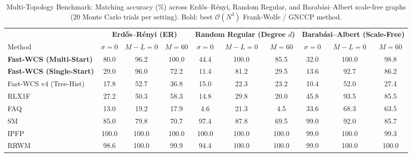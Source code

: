 \begin{table}[!t]
\centering
\caption{Multi-Topology Benchmark: Matching accuracy (\%) across Erdős–Rényi, Random Regular, and Barabási–Albert scale-free graphs (20 Monte Carlo trials per setting). Bold: best $\mathcal{O}(N^3)$ Frank-Wolfe / GNCCP method.}
\label{tab:topologies}
\fontsize{6.8}{8.2}\selectfont
\setlength{\tabcolsep}{2.8pt}
\begin{tabular*}{\textwidth}{@{\extracolsep{\fill}}lccccccccc@{}}
\toprule
 & \multicolumn{3}{c}{\textbf{Erdős–Rényi (ER)}} & \multicolumn{3}{c}{\textbf{Random Regular (Degree $d$)}} & \multicolumn{3}{c}{\textbf{Barabási–Albert (Scale-Free)}} \\
\cmidrule(lr){2-4}\cmidrule(lr){5-7}\cmidrule(l){8-10}
Method & $\sigma{=}0$ & $M{-}L{=}0$ & $M{=}60$ & $\sigma{=}0$ & $M{-}L{=}0$ & $M{=}60$ & $\sigma{=}0$ & $M{-}L{=}0$ & $M{=}60$ \\
\midrule
\textbf{Fast-WCS (Multi-Start)} & 80.0 & 96.2 & 100.0 & 44.4 & 100.0 & 85.5 & 32.0 & 100.0 & 98.8 \\
\textbf{Fast-WCS (Single-Start)} & 29.0 & 96.0 & 72.2 & 11.4 & 81.2 & 29.5 & 13.6 & 92.7 & 86.2 \\
Fast-WCS v4 (Tree-Hist) & 17.8 & 52.7 & 36.8 & 15.0 & 22.3 & 23.2 & 10.4 & 52.0 & 27.4 \\
\midrule
RLX1F~\cite{yang2018algorithm} & 27.2 & 50.3 & 58.3 & 14.8 & 29.8 & 20.0 & 45.8 & 93.5 & 85.5 \\
\midrule
FAQ~\cite{vogelstein2015fast} & 13.0 & 19.2 & 17.9 & 4.6 & 21.3 & 4.5 & 33.6 & 68.3 & 63.5 \\
SM~\cite{leordeanu2005} & 85.0 & 79.8 & 70.7 & 97.4 & 87.8 & 69.5 & 99.0 & 92.0 & 85.7 \\
IPFP~\cite{leordeanu2009ipfp} & 100.0 & 100.0 & 100.0 & 100.0 & 100.0 & 100.0 & 99.0 & 100.0 & 99.3 \\
RRWM~\cite{cho2010rrwm} & 98.6 & 100.0 & 99.9 & 94.4 & 100.0 & 100.0 & 99.0 & 100.0 & 100.0 \\
\bottomrule
\end{tabular*}
\end{table}
